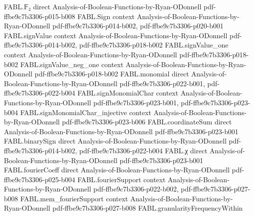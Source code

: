 \begin{theorem}
\label{FABL.measure_randomBooleanFunction_fourierCoeff_atThreshold_ge_le}
\leanok
{}
\proofstep
  {FABL.𝔽₂}
  {direct}
  {Analysis-of-Boolean-Functions-by-Ryan-ODonnell}
  {pdf-ffbe9c7b3306-p015-b008}
\proofstep
  {FABL.Sign}
  {context}
  {Analysis-of-Boolean-Functions-by-Ryan-ODonnell}
  {pdf-ffbe9c7b3306-p014-b002,
    pdf-ffbe9c7b3306-p020-b001}
\proofstep
  {FABL.signValue}
  {context}
  {Analysis-of-Boolean-Functions-by-Ryan-ODonnell}
  {pdf-ffbe9c7b3306-p014-b002,
    pdf-ffbe9c7b3306-p018-b002}
\proofstep
  {FABL.signValue_one}
  {context}
  {Analysis-of-Boolean-Functions-by-Ryan-ODonnell}
  {pdf-ffbe9c7b3306-p018-b002}
\proofstep
  {FABL.signValue_neg_one}
  {context}
  {Analysis-of-Boolean-Functions-by-Ryan-ODonnell}
  {pdf-ffbe9c7b3306-p018-b002}
\proofstep
  {FABL.monomial}
  {direct}
  {Analysis-of-Boolean-Functions-by-Ryan-ODonnell}
  {pdf-ffbe9c7b3306-p022-b001,
    pdf-ffbe9c7b3306-p022-b004}
\proofstep
  {FABL.signMonomialChar}
  {context}
  {Analysis-of-Boolean-Functions-by-Ryan-ODonnell}
  {pdf-ffbe9c7b3306-p023-b001,
    pdf-ffbe9c7b3306-p023-b004}
\proofstep
  {FABL.signMonomialChar_injective}
  {context}
  {Analysis-of-Boolean-Functions-by-Ryan-ODonnell}
  {pdf-ffbe9c7b3306-p023-b006}
\proofstep
  {FABL.coordinateSum}
  {direct}
  {Analysis-of-Boolean-Functions-by-Ryan-ODonnell}
  {pdf-ffbe9c7b3306-p023-b001}
\proofstep
  {FABL.binarySign}
  {direct}
  {Analysis-of-Boolean-Functions-by-Ryan-ODonnell}
  {pdf-ffbe9c7b3306-p014-b002,
    pdf-ffbe9c7b3306-p022-b004}
\proofstep
  {FABL.χ}
  {direct}
  {Analysis-of-Boolean-Functions-by-Ryan-ODonnell}
  {pdf-ffbe9c7b3306-p023-b001}
\proofstep
  {FABL.fourierCoeff}
  {direct}
  {Analysis-of-Boolean-Functions-by-Ryan-ODonnell}
  {pdf-ffbe9c7b3306-p025-b004}
\proofstep
  {FABL.fourierSupport}
  {context}
  {Analysis-of-Boolean-Functions-by-Ryan-ODonnell}
  {pdf-ffbe9c7b3306-p022-b002,
    pdf-ffbe9c7b3306-p027-b008}
\proofstep
  {FABL.mem_fourierSupport}
  {context}
  {Analysis-of-Boolean-Functions-by-Ryan-ODonnell}
  {pdf-ffbe9c7b3306-p027-b008}
\proofstep
  {FABL.granularityFrequencyWithin}

\end{theorem}
